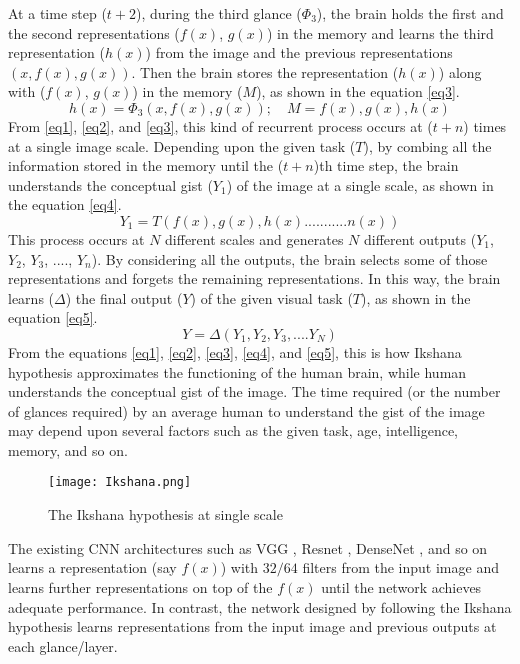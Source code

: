 \documentclass{article}
\begin{document}
At a time step ($t+2$), during the third glance ($\Phi_{3}$), the brain holds the first and the second representations ($f(x)$, $g(x)$) in the memory and learns the third representation ($h(x)$) from the image and the previous representations $(x,f(x),g(x))$. Then the brain stores the representation ($h(x)$) along with ($f(x)$, $g(x)$) in the memory ($M$), as shown in the equation \ref{eq3}.  
\begin{equation} \label{eq3}  
 h(x) = \Phi_{3}(x,f(x),g(x))   ;  \quad M = f(x),g(x),h(x)
\end{equation}
From \ref{eq1}, \ref{eq2}, and \ref{eq3}, this kind of recurrent process occurs at ($t+n$) times at a single image scale. Depending upon the given task ($T$), by combing all the information stored in the memory until the ($t+n$)th time step, the brain understands the conceptual gist ($Y_{1}$) of the image at a single scale, as shown in the equation \ref{eq4}. 
\begin{equation} \label{eq4}  
 Y_{1} = T(f(x), g(x), h(x)...........n(x))
\end{equation}
This process occurs at $N$ different scales and generates $N$ different outputs ($Y_{1}$, $Y_{2}$, $Y_{3}$, ...., $Y_{n}$). By considering all the outputs, the brain selects some of those representations and forgets the remaining representations. In this way, the brain learns ($\Delta$) the final output ($Y$) of the given visual task ($T$), as shown in the equation \ref{eq5}.
\begin{equation} \label{eq5}  
 Y = \Delta ( Y_{1},Y_{2},Y_{3},....Y_{N})
\end{equation}
From the equations \ref{eq1}, \ref{eq2}, \ref{eq3}, \ref{eq4}, and \ref{eq5}, this is how Ikshana hypothesis approximates the functioning of the human brain, while human understands the conceptual gist of the image.
The time required (or the number of glances required) by an average human to understand the gist of the image may depend upon several factors such as the given task, age, intelligence, memory, and so on. 
\begin{figure}[ht]
\begin{center}
   \texttt{[image: Ikshana.png]}
\end{center}
   \caption{The Ikshana hypothesis at single scale}
\label{fig:ikshana}
\end{figure}

\noindent The existing CNN architectures such as VGG \cite{simonyan2014very}, Resnet \cite{he2016deep}, DenseNet \cite{huang2017densely}, and so on learns a representation (say $f(x)$) with $32/64$ filters from the input image and learns further representations on top of the $f(x)$ until the network achieves adequate performance. In contrast, the network designed by following the Ikshana hypothesis learns representations from the input image and previous outputs at each glance/layer.
\end{document}
